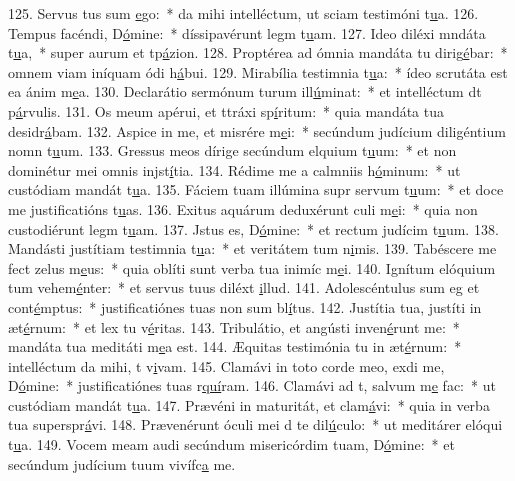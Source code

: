 125. Servus tus sum \uline{e}go:~* da mihi intelléctum, ut sciam testimóni t\uline{u}a.
126. Tempus facéndi, D\uline{ó}mine:~* díssipavérunt legm t\uline{u}am.
127. Ideo diléxi mndáta t\uline{u}a,~* super aurum et tp\uline{á}zion.
128. Proptérea ad ómnia mandáta tu dirig\uline{é}bar:~* omnem viam iníquam ódi h\uline{á}bui.
129. Mirabília testimnia t\uline{u}a:~* ídeo scrutáta est ea ánim m\uline{e}a.
130. Declarátio sermónum turum ill\uline{ú}minat:~* et intelléctum dt p\uline{á}rvulis.
131. Os meum apérui, et ttráxi sp\uline{í}ritum:~* quia mandáta tua desidr\uline{á}bam.
132. Aspice in me, et misrére m\uline{e}i:~* secúndum judícium diligéntium nomn t\uline{u}um.
133. Gressus meos dírige secúndum elquium t\uline{u}um:~* et non dominétur mei omnis injst\uline{í}tia.
134. Rédime me a calmniis h\uline{ó}minum:~* ut custódiam mandát t\uline{u}a.
135. Fáciem tuam illúmina supr servum t\uline{u}um:~* et doce me justificatións t\uline{u}as.
136. Exitus aquárum deduxérunt culi m\uline{e}i:~* quia non custodiérunt legm t\uline{u}am.
137. Jstus es, D\uline{ó}mine:~* et rectum judícim t\uline{u}um.
138. Mandásti justítiam testimnia t\uline{u}a:~* et veritátem tum n\uline{i}mis.
139. Tabéscere me fect zelus m\uline{e}us:~* quia oblíti sunt verba tua inimíc m\uline{e}i.
140. Ignítum elóquium tum vehem\uline{é}nter:~* et servus tuus diléxt \uline{i}llud.
141. Adolescéntulus sum eg et cont\uline{é}mptus:~* justificatiónes tuas non sum bl\uline{í}tus.
142. Justítia tua, justíti in æt\uline{é}rnum:~* et lex tu v\uline{é}ritas.
143. Tribulátio, et angústi inven\uline{é}runt me:~* mandáta tua meditáti m\uline{e}a est.
144. Æquitas testimónia tu in æt\uline{é}rnum:~* intelléctum da mihi, t v\uline{i}vam.
145. Clamávi in toto corde meo, exdi me, D\uline{ó}mine:~* justificatiónes tuas r\uline{quí}ram.
146. Clamávi ad t, salvum m\uline{e} fac:~* ut custódiam mandát t\uline{u}a.
147. Prævéni in maturitát, et clam\uline{á}vi:~* quia in verba tua superspr\uline{á}vi.
148. Prævenérunt óculi mei d te dil\uline{ú}culo:~* ut meditárer elóqui t\uline{u}a.
149. Vocem meam audi secúndum misericórdim tuam, D\uline{ó}mine:~* et secúndum judícium tuum vivífc\uline{a} me.
